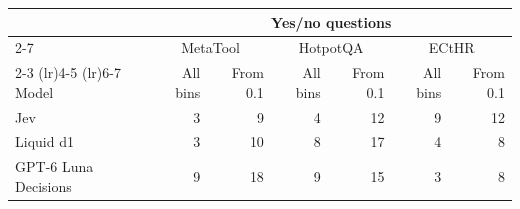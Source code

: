 \begin{tabular}{lrrrrrr}
\toprule
 & \multicolumn{6}{c}{Yes/no questions} \\
\cmidrule(lr){2-7}
 & \multicolumn{2}{c}{MetaTool} & \multicolumn{2}{c}{HotpotQA} & \multicolumn{2}{c}{ECtHR} \\
\cmidrule(lr){2-3} \cmidrule(lr){4-5} \cmidrule(lr){6-7}
Model & All bins & From 0.1 & All bins & From 0.1 & All bins & From 0.1 \\
\midrule
Jev & 3 & 9 & 4 & 12 & 9 & 12 \\
Liquid d1 & 3 & 10 & 8 & 17 & 4 & 8 \\
GPT-6 Luna Decisions & 9 & 18 & 9 & 15 & 3 & 8 \\
\bottomrule
\end{tabular}
